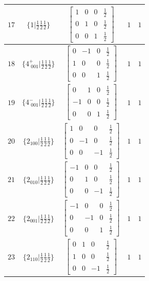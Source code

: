 \documentclass[fleqn,8pt]{jsarticle}
\begin{document}
\begin{longtable}{ccccc}
$ 17 $ & $ \{1|\frac{1}{2} \frac{1}{2} \frac{1}{2}\} $ & $ \begin{bmatrix} 1 & 0 & 0 & \frac{1}{2} \\ 0 & 1 & 0 & \frac{1}{2} \\ 0 & 0 & 1 & \frac{1}{2} \end{bmatrix} $ & $ 1 $ & $ 1 $ \\ \hline
$ 18 $ & $ \{4^{+}_{\,\,001}|\frac{1}{2} \frac{1}{2} \frac{1}{2}\} $ & $ \begin{bmatrix} 0 & -1 & 0 & \frac{1}{2} \\ 1 & 0 & 0 & \frac{1}{2} \\ 0 & 0 & 1 & \frac{1}{2} \end{bmatrix} $ & $ 1 $ & $ 1 $ \\ \hline
$ 19 $ & $ \{4^{-}_{\,\,001}|\frac{1}{2} \frac{1}{2} \frac{1}{2}\} $ & $ \begin{bmatrix} 0 & 1 & 0 & \frac{1}{2} \\ -1 & 0 & 0 & \frac{1}{2} \\ 0 & 0 & 1 & \frac{1}{2} \end{bmatrix} $ & $ 1 $ & $ 1 $ \\ \hline
$ 20 $ & $ \{2{}_{100}|\frac{1}{2} \frac{1}{2} \frac{1}{2}\} $ & $ \begin{bmatrix} 1 & 0 & 0 & \frac{1}{2} \\ 0 & -1 & 0 & \frac{1}{2} \\ 0 & 0 & -1 & \frac{1}{2} \end{bmatrix} $ & $ 1 $ & $ 1 $ \\ \hline
$ 21 $ & $ \{2{}_{010}|\frac{1}{2} \frac{1}{2} \frac{1}{2}\} $ & $ \begin{bmatrix} -1 & 0 & 0 & \frac{1}{2} \\ 0 & 1 & 0 & \frac{1}{2} \\ 0 & 0 & -1 & \frac{1}{2} \end{bmatrix} $ & $ 1 $ & $ 1 $ \\ \hline
$ 22 $ & $ \{2{}_{001}|\frac{1}{2} \frac{1}{2} \frac{1}{2}\} $ & $ \begin{bmatrix} -1 & 0 & 0 & \frac{1}{2} \\ 0 & -1 & 0 & \frac{1}{2} \\ 0 & 0 & 1 & \frac{1}{2} \end{bmatrix} $ & $ 1 $ & $ 1 $ \\ \hline
$ 23 $ & $ \{2{}_{110}|\frac{1}{2} \frac{1}{2} \frac{1}{2}\} $ & $ \begin{bmatrix} 0 & 1 & 0 & \frac{1}{2} \\ 1 & 0 & 0 & \frac{1}{2} \\ 0 & 0 & -1 & \frac{1}{2} \end{bmatrix} $ & $ 1 $ & $ 1 $ \\ \hline

\end{longtable}
\end{document}
